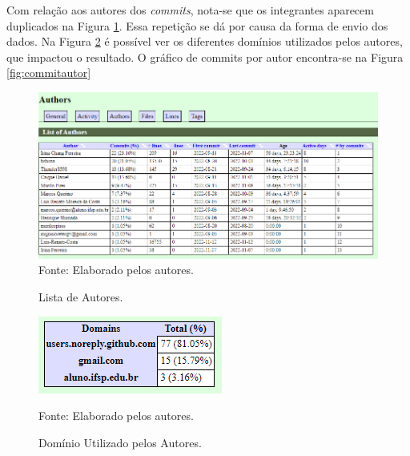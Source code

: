\documentclass[
    12pt,               %
    openright,          %
    oneside,
    a4paper,            %
    BIBLATEX,           %
    TODO,               %
    english,            %
    brazil              %
    ]{ifsp-spo-inf-ctds}
\begin{document}
    Com relação aos autores dos \emph{commits}, nota-se que os integrantes aparecem duplicados na Figura \ref{fig:listaautores}. Essa repetição se dá por causa da forma de envio dos dados. Na Figura \ref{fig:dominio} é possível ver os diferentes domínios utilizados pelos autores, que impactou o resultado. O gráfico de commits por autor encontra-se na Figura \ref{fig:commitautor}

    \begin{figure}[H]
                \centering
                \caption{Lista de Autores.}
                \includegraphics[width=1 \textwidth]{Gitstats/documento/lista de autores.png}
                {\footnotesize Fonte: Elaborado pelos autores.}
                \label{fig:listaautores}
            \end{figure}

    \begin{figure}[H]
            \centering
            \caption{Domínio Utilizado pelos Autores.}
            \includegraphics[scale = 1.5]{Gitstats/documento/dominios1.png}

            {\footnotesize Fonte: Elaborado pelos autores.}
            \label{fig:dominio}
        \end{figure}  
\end{document}
